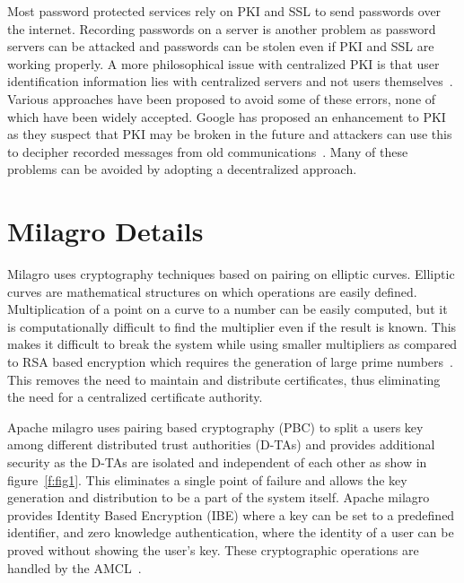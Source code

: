Most password protected services rely on PKI and SSL to send passwords
over the internet. Recording passwords on a server is another problem
as password servers can be attacked and passwords can be stolen even
if PKI and SSL are working properly. A more philosophical issue with
centralized PKI is that user identification information lies with
centralized servers and not users
themselves~\cite{distlab-pki-problems}. Various approaches have been
proposed to avoid some of these errors, none of which have been widely
accepted. Google has proposed an enhancement to PKI as they suspect that
PKI may be broken in the future and attackers can use this to decipher
recorded messages from old
communications~\cite{securityweek-ssl-threats}.  Many of these
problems can be avoided by adopting a decentralized approach.


\section{Milagro Details}
Milagro uses cryptography techniques based on pairing on elliptic
curves. Elliptic curves are mathematical structures on which
operations are easily defined. Multiplication of a point on a curve to
a number can be easily computed, but it is computationally difficult
to find the multiplier even if the result is known. This makes it
difficult to break the system while using smaller multipliers as
compared to RSA based encryption which requires the generation of large
prime numbers~\cite{milagro-concepts}. This removes the need to
maintain and distribute certificates, thus eliminating the need for a
centralized certificate authority.

Apache milagro uses pairing based cryptography (PBC) to split a users
key among different distributed trust authorities (D-TAs) and provides
additional security as the D-TAs are isolated and independent of each
other as show in figure~\ref{f:fig1}. This eliminates a single point
of failure and allows the key generation and distribution to be a
part of the system itself. Apache milagro provides Identity Based
Encryption (IBE) where a key can be set to a predefined identifier,
and zero knowledge authentication, where the identity of a user can be
proved without showing the user's key.  These cryptographic operations
are handled by the AMCL~\cite{milagro-concepts}.


